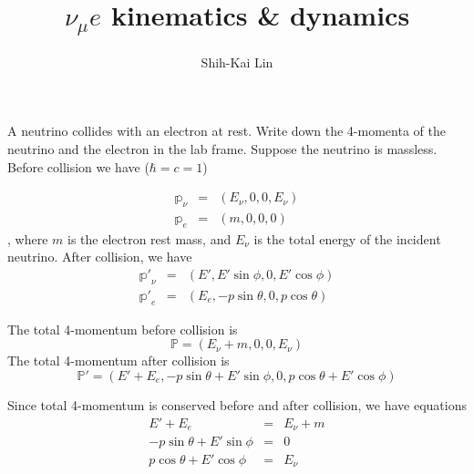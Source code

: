\documentclass{beamer}
\author{Shih-Kai Lin}
\date{}
\title{\texorpdfstring{$\nu_\mu e$}{nu-e} kinematics \& dynamics}
\begin{document}
\begin{frame}
\titlepage
\end{frame}
\begin{frame}[allowframebreaks]{}

\begin{figure}
\centering
\end{figure}


A neutrino collides with an electron at rest. Write down the 4-momenta of the neutrino and the electron in the lab frame. Suppose the neutrino is massless. Before collision we have ($\hbar=c=1$)

\framebreak

\begin{eqnarray}
\mathbb{p}_\nu &=&(E_\nu,0,0,E_\nu) \label{eq:pnu}\\
\mathbb{p}_e&=&(m,0,0,0) \label{eq:pe}
\end{eqnarray}
, where $m$ is the electron rest mass, and $E_\nu$ is the total energy of the incident neutrino.
After collision, we have
\begin{eqnarray}
\mathbb{p'}_\nu &=&(E',E'\sin\phi,0,E'\cos\phi) \label{eq:ppnu} \\
\mathbb{p'}_e &=& (E_e,-p\sin\theta,0,p\cos\theta) \label{eq:ppe}
\end{eqnarray}


The total 4-momentum before collision is
\begin{equation} \label{eq:ptot}
  \mathbb{P} = (E_\nu+m,0,0,E_\nu)
\end{equation}
The total 4-momentum after collision is
\begin{equation} \label{eq:pptot}
  \mathbb{P}' = (E'+E_e,-p\sin\theta+E'\sin\phi,0,p\cos\theta+E'\cos\phi)
\end{equation}

\framebreak

Since total 4-momentum is conserved before and after collision, we have equations
\begin{eqnarray}
  E'+E_e &=& E_\nu+m \label{eq:E} \\
  -p\sin\theta+E'\sin\phi &=& 0 \label{eq:ptotx} \\
  p\cos\theta+E'\cos\phi &=& E_\nu \label{eq:ptotz}
\end{eqnarray}


\end{frame}
\end{document}
